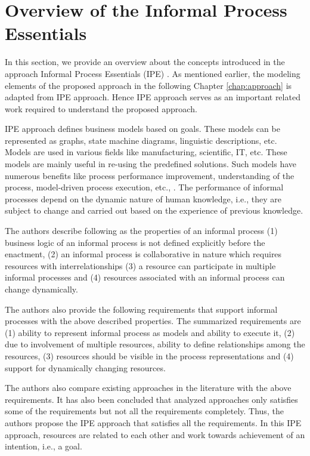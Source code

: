 \section{Overview of the Informal Process Essentials}
\label{sec:basicconcepts}
In this section, we provide an overview about the concepts introduced in the approach Informal Process Essentials (IPE) \cite{Sungur2014a}. As mentioned earlier, the modeling elements of the proposed approach in the following Chapter \ref{chap:approach} is adapted from IPE approach. Hence IPE approach serves as an important related work required to understand the proposed approach. 

IPE approach defines business models based on goals. These models can be represented as graphs, state machine diagrams, linguistic descriptions, etc. Models are used in various fields like manufacturing, scientific, IT, etc. These models are mainly useful in re-using the predefined solutions. Such models have numerous benefits like process performance improvement, understanding of the process, model-driven process execution, etc., \cite{Indulska2009}. The performance of informal processes depend on the dynamic nature of human knowledge, i.e., they are subject to change and carried out based on the experience of previous knowledge. 

The authors describe following as the properties of an informal process (1) business logic of an informal process is not defined explicitly before the enactment, (2) an informal process is collaborative in nature which requires resources with interrelationships (3) a resource can participate in multiple informal processes and (4) resources associated with an informal process can change dynamically.

The authors also provide the following requirements that support informal processes with the above described properties. The summarized requirements are (1) ability to represent informal process as models and ability to execute it, (2) due to involvement of multiple resources, ability to define relationships among the resources, (3) resources should be visible in the process representations and (4) support for dynamically changing resources. 

The authors also compare existing approaches in the literature with the above requirements. It has also been concluded that analyzed approaches only satisfies some of the requirements but not all the requirements completely. Thus, the authors propose the IPE approach that satisfies all the requirements. In this IPE approach, resources are related to each other and work towards achievement of an intention, i.e., a goal.   

